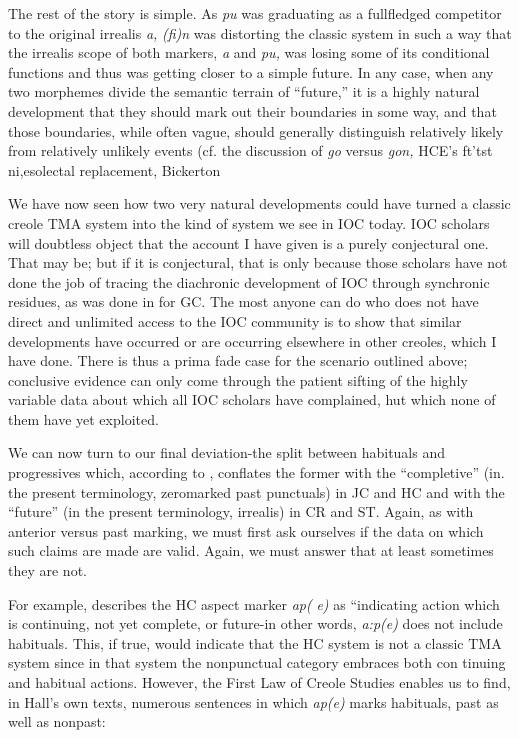 The rest of the story is simple. As \textit{pu} was graduating as a full\-fledged competitor to the original irrealis \textit{a,} \textit{(fi)n} was distorting the classic system in such a way that the irrealis scope of both markers, \textit{a} and \textit{pu,} was losing some of its conditional functions and thus was getting closer to a simple future. In any case, when any two mor\-phemes divide the semantic terrain of ``future,'' it is a highly natural development that they should mark out their boundaries in some way, and that those boundaries, while often vague, should generally dis\-tinguish relatively likely from relatively unlikely events (cf. the discus\-sion of \textit{go} versus \textit{gon,} HCE's ft'tst ni,esolectal replacement, Bickerton

We have now seen how two very natural developments could
have turned a classic creole TMA system into the kind of system we see in IOC today. IOC scholars will doubtless object that the account I have given is a purely conjectural one. That may be; but if it is con\-jectural, that is only because those scholars have not done the job of tracing the diachronic development of IOC through synchronic resi\-dues, as was done in \citet{Bickerton1975} for GC. The most anyone can do who does not have direct and unlimited access to the IOC commun\-ity is to show that similar developments have occurred or are occurring elsewhere in other creoles, which I have done. There is thus a prima fade case for the scenario outlined above; conclusive evidence can only come through the patient sifting of the highly variable data about which all IOC scholars have complained, hut which none of them have yet exploited.

We can now turn to our final deviation-the split between habi\-tuals and progressives which, according to \citet{Taylor1971}, conflates the former with the ``completive'' (in. the present terminology, zero\-marked past punctuals) in JC and HC and with the ``future'' (in the present terminology, irrealis) in CR and ST. Again, as with anterior versus past marking, we must first ask ourselves if the data on which such claims are made are valid. Again, we must answer that at least sometimes they are not.

For example, \citet[31]{Hall1953} describes the HC aspect marker \textit{ap(} \textit{e}\textit{)} as ``indicating action which is continuing, not yet complete, or future{\textquotedbl}{}-in other words, \textit{a:p}\textit{(}\textit{e}\textit{) }does not include habituals. This, if true, would indicate that the HC system is not a classic TMA system since in that system the nonpunctual category embraces both con%
tinuing and habitual actions. However, the First Law of Creole Studies enables us to find, in Hall's own texts, numerous sentences in which \textit{ap(e)} marks habituals, past as well as nonpast:

